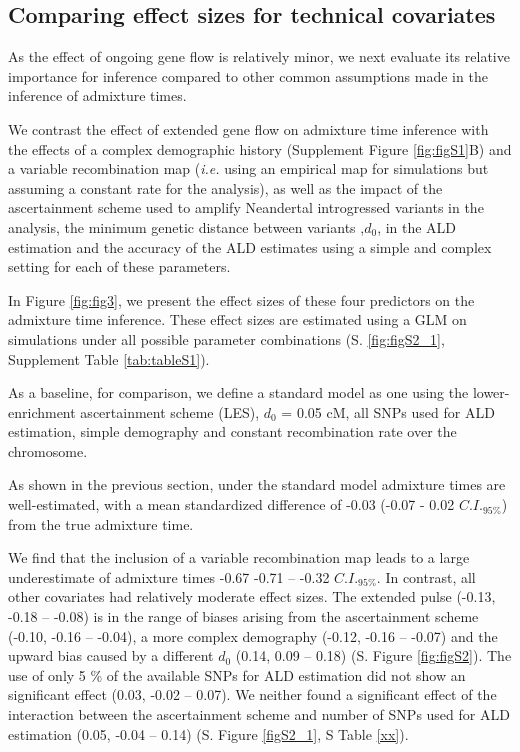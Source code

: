 \documentclass[11pt]{article}
\begin{document}
\subsection{Comparing effect sizes for technical covariates}\label{comparing effect sizes}

As the effect of ongoing gene flow is relatively minor, we next evaluate its relative importance for inference compared to other common assumptions made in the inference of admixture times. 

We contrast the effect of extended gene flow on admixture time inference with  the effects of a complex demographic history (Supplement Figure \ref{fig:figS1}B) and a variable recombination map (\emph{i.e.} using an empirical map for simulations but assuming a constant rate for the analysis), as well as the impact of the ascertainment scheme used to amplify Neandertal introgressed variants in the analysis, the minimum genetic distance between variants ,$d_0$, in the ALD estimation and the accuracy of the ALD estimates using a simple and complex setting for each of these parameters. 

In Figure \ref{fig:fig3}, we present the effect sizes of these four predictors on the admixture time inference. These effect sizes are estimated using a GLM on simulations under all possible parameter combinations  (S. \ref{fig:figS2_1}, Supplement Table \ref{tab:tableS1}).

As a baseline, for comparison, we define a standard model as one using the lower-enrichment ascertainment scheme (LES), $d_{0}$ = 0.05 cM, all SNPs used for ALD estimation, simple demography and constant recombination rate over the chromosome. 

As shown in the previous section, under the standard model admixture times are well-estimated, with a mean standardized difference of  -0.03 (-0.07 - 0.02 $C.I._{95\%}$) from the true
admixture time.

We find that the  inclusion of a variable recombination map leads to a large underestimate of admixture times -0.67 -0.71 -- -0.32 $C.I._{95\%}$. In contrast, all other covariates had relatively moderate effect sizes. The extended pulse   (-0.13,  -0.18 -- -0.08) is in the range of biases arising from the ascertainment scheme (-0.10, -0.16 --
-0.04), a more complex demography (-0.12, -0.16 -- -0.07) and the upward bias caused by a different $d_0$ (0.14, 0.09 --
0.18) (S. Figure \ref{fig:figS2}). The use of only 5 \% of the available SNPs for ALD estimation did not show an significant effect (0.03, -0.02 -- 0.07). We neither found a significant effect of the interaction between the ascertainment scheme and number of SNPs used for ALD estimation (0.05, -0.04 -- 0.14) (S. Figure \ref{figS2_1}, S Table \ref{xx}). 
\end{document}
